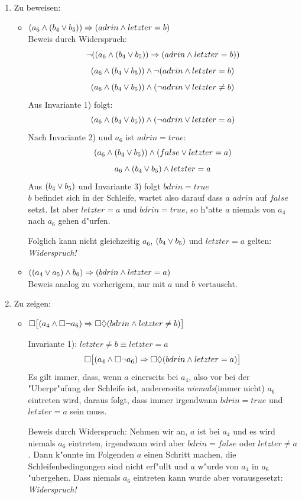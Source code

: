\documentclass[a4paper,twoside,12pt]{article}
\begin{document}
\begin{description}
\begin{enumerate}
	\item Zu beweisen:
	\begin{itemize}
		\item $(a_6 \wedge (b_4 \vee b_5)) \Rightarrow (adrin \wedge letzter = b)$\\
			Beweis durch Widerspruch:
			\[ \neg((a_6 \wedge (b_4 \vee b_5)) \Rightarrow (adrin \wedge letzter = b)) \]
			\[ (a_6 \wedge (b_4 \vee b_5)) \wedge \neg (adrin \wedge letzter = b) \]
			\[ (a_6 \wedge (b_4 \vee b_5)) \wedge (\neg adrin \vee letzter \neq b) \]
			Aus Invariante 1) folgt:
			\[ (a_6 \wedge (b_4 \vee b_5)) \wedge (\neg adrin \vee letzter = a) \]
			Nach Invariante 2) und $a_6$ ist $adrin = true$:
			\[ (a_6 \wedge (b_4 \vee b_5)) \wedge (false \vee letzter = a) \]
			\[ a_6 \wedge (b_4 \vee b_5) \wedge letzter = a \]
			Aus $(b_4 \vee b_5)$ und Invariante 3) folgt $bdrin = true$\\
			$b$ befindet sich in der Schleife, wartet also darauf dass $a$
			$adrin$ auf $false$ setzt. Ist aber $letzter = a$ und $bdrin = true$,
			so h"atte $a$ niemals von $a_4$ nach $a_6$ gehen d"urfen.

			Folglich kann nicht gleichzeitig $a_6$, $(b_4 \vee b_5)$ und $letzter = a$ gelten:\\
			\emph{Widerspruch!}

		\item $((a_4 \vee a_5) \wedge b_6) \Rightarrow (bdrin \wedge letzter = a)$\\
			Beweis analog zu vorherigem, nur mit $a$ und $b$ vertauscht.
	\end{itemize}
	\item Zu zeigen:
	\begin{itemize}
		\item $\Box \big [(a_4 \wedge \Box \neg a_6) \Rightarrow \Box \lozenge (bdrin \wedge letzter \neq b) \big ]$

		Invariante 1): $letzter \neq b \equiv letzter = a$
		\[ \Box \big [(a_4 \wedge \Box \neg a_6) \Rightarrow \Box \lozenge (bdrin \wedge letzter = a) \big ] \]
		Es gilt immer, dass, wenn $a$ einerseits bei $a_4$, also vor bei der "Uberpr"ufung der Schleife ist,
		andererseits \emph{niemals}(immer nicht) $a_6$ eintreten wird, daraus folgt, dass immer
		irgendwann $bdrin = true$ und $letzter = a$ sein muss.

		Beweis durch Widerspruch: Nehmen wir an, $a$ ist bei $a_4$ und es wird niemals $a_6$ eintreten,
		irgendwann wird aber $bdrin = false$ oder $letzter \neq a$. Dann k"onnte im Folgenden
		$a$ einen Schritt machen, die Schleifenbedingungen sind nicht erf"ullt und $a$ w"urde von
		$a_4$ in $a_6$ "ubergehen. Dass niemals $a_6$ eintreten kann wurde aber vorausgesetzt:
		\emph{Widerspruch!}


\end{itemize}
\end{enumerate}
\end{description}
\end{document}
